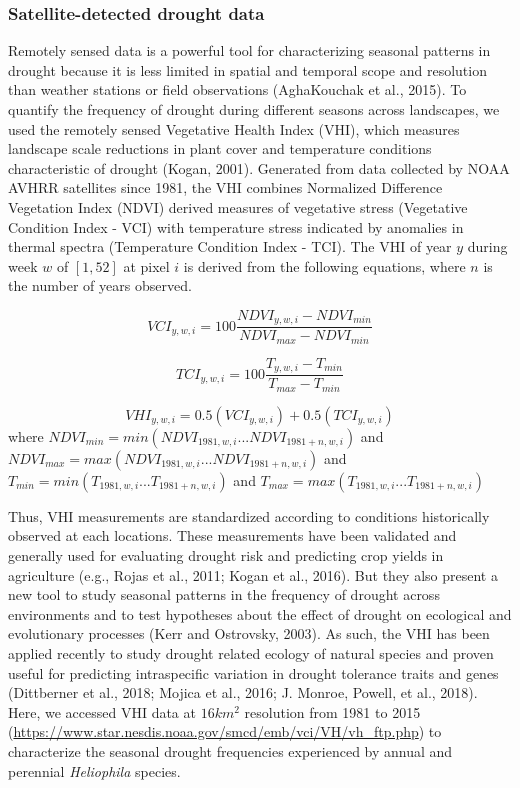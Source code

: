 \documentclass[man,floatsintext]{apa6}
\theoremstyle{definition}
\theoremstyle{definition}
\theoremstyle{definition}
\theoremstyle{remark}
\begin{document}
\hypertarget{satellite-detected-drought-data}{%
\subsubsection{Satellite-detected drought
data}\label{satellite-detected-drought-data}}

Remotely sensed data is a powerful tool for characterizing seasonal
patterns in drought because it is less limited in spatial and temporal
scope and resolution than weather stations or field observations
(AghaKouchak et al., 2015). To quantify the frequency of drought during
different seasons across landscapes, we used the remotely sensed
Vegetative Health Index (VHI), which measures landscape scale reductions
in plant cover and temperature conditions characteristic of drought
(Kogan, 2001). Generated from data collected by NOAA AVHRR satellites
since 1981, the VHI combines Normalized Difference Vegetation Index
(NDVI) derived measures of vegetative stress (Vegetative Condition Index
- VCI) with temperature stress indicated by anomalies in thermal spectra
(Temperature Condition Index - TCI). The VHI of year \(y\) during week
\(w\) of \([1,52]\) at pixel \(i\) is derived from the following
equations, where \(n\) is the number of years observed.

\[VCI_{y,w,i} = 100\frac{NDVI_{y,w,i} - NDVI_{min}}{NDVI_{max} - NDVI_{min}}\]

\[TCI_{y,w,i} = 100\frac{T_{y,w,i} - T_{min}}{T_{max} - T_{min}}\]

\[VHI_{y,w,i} = 0.5(VCI_{y,w,i}) + 0.5(TCI_{y,w,i})\] where
\(NDVI_{min} = min(NDVI_{1981,w,i}...NDVI_{1981+n,w,i})\) and
\(NDVI_{max} = max(NDVI_{1981,w,i}...NDVI_{1981+n,w,i})\) and
\(T_{min} = min(T_{1981,w,i}...T_{1981+n,w,i})\) and
\(T_{max} = max(T_{1981,w,i}...T_{1981+n,w,i})\)

Thus, VHI measurements are standardized according to conditions
historically observed at each locations. These measurements have been
validated and generally used for evaluating drought risk and predicting
crop yields in agriculture (e.g., Rojas et al., 2011; Kogan et al.,
2016). But they also present a new tool to study seasonal patterns in
the frequency of drought across environments and to test hypotheses
about the effect of drought on ecological and evolutionary processes
(Kerr and Ostrovsky, 2003). As such, the VHI has been applied recently
to study drought related ecology of natural species and proven useful
for predicting intraspecific variation in drought tolerance traits and
genes (Dittberner et al., 2018; Mojica et al., 2016; J. Monroe, Powell,
et al., 2018). Here, we accessed VHI data at \(16km^2\) resolution from
1981 to 2015
(\url{https://www.star.nesdis.noaa.gov/smcd/emb/vci/VH/vh_ftp.php}) to
characterize the seasonal drought frequencies experienced by annual and
perennial \emph{Heliophila} species.
\end{document}
